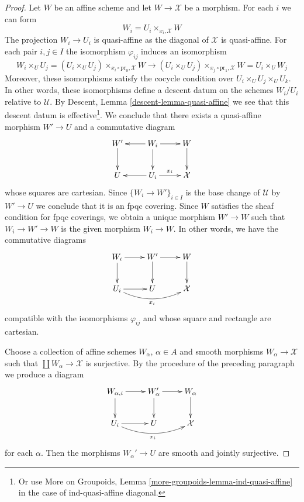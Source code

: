 \documentclass{stacks-project}
\theoremstyle{plain}
\theoremstyle{definition}
\theoremstyle{remark}
\numberwithin{equation}{subsection}
\begin{document}
\begin{proof}
\medskip\noindent
Let $W$ be an affine scheme and let $W \to \mathcal{X}$
be a morphism. For each $i$ we can form
$$
W_i = U_i \times_{x_i, \mathcal{X}} W
$$
The projection $W_i \to U_i$ is quasi-affine as the
diagonal of $\mathcal{X}$ is quasi-affine. For each pair
$i, j \in I$ the isomorphism $\varphi_{ij}$ induces
an isomorphism
$$
W_i \times_U U_j =
(U_i \times_U U_j) \times_{x_i \circ \text{pr}_0, \mathcal{X}} W
\to
(U_i \times_U U_j) \times_{x_j \circ \text{pr}_1, \mathcal{X}} W =
U_i \times_U W_j
$$
Moreover, these isomorphisms satisfy the cocycle condition over
$U_i \times_U U_j \times_U U_k$. In other words, these isomorphisms
define a descent datum on the schemes $W_i/U_i$ relative to $\mathcal{U}$.
By Descent, Lemma \ref{descent-lemma-quasi-affine}
we see that this descent datum is effective\footnote{Or use
More on Groupoids, Lemma \ref{more-groupoids-lemma-ind-quasi-affine}
in the case of ind-quasi-affine diagonal.}.
We conclude that there exists a quasi-affine morphism
$W' \to U$ and a commutative diagram
$$
\xymatrix{
W' \ar[d] &
W_i \ar[l] \ar[d] \ar[r] &
W \ar[d] \\
U &
U_i \ar[l] \ar[r]^{x_i} &
\mathcal{X}
}
$$
whose squares are cartesian. Since $\{W_i \to W'\}_{i \in I}$
is the base change of $\mathcal{U}$ by $W' \to U$ we conclude
that it is an fpqc covering. Since $W$ satisfies the sheaf
condition for fpqc coverings, we obtain a unique morphism
$W' \to W$ such that $W_i \to W' \to W$ is the given morphism
$W_i \to W$. In other words, we have the commutative diagrams
$$
\xymatrix{
W_i \ar[d] \ar[r] &
W' \ar[d] \ar[r] &
W \ar[d] \\
U_i \ar[r] \ar@/_1pc/[rr]_{x_i} &
U &
\mathcal{X}
}
$$
compatible with the isomorphisms $\varphi_{ij}$ and whose
square and rectangle are cartesian.

\medskip\noindent
Choose a collection of affine schemes $W_\alpha$, $\alpha \in A$
and smooth morphisms $W_\alpha \to \mathcal{X}$ such that
$\coprod W_\alpha \to \mathcal{X}$ is surjective.
By the procedure of the preceding paragraph we produce
a diagram
$$
\xymatrix{
W_{\alpha, i} \ar[d] \ar[r] &
W_\alpha' \ar[d] \ar[r] &
W_\alpha \ar[d] \\
U_i \ar[r] \ar@/_1pc/[rr]_{x_i} &
U &
\mathcal{X}
}
$$
for each $\alpha$. Then the morphisms $W_\alpha' \to U$ are
smooth and jointly surjective.


\end{proof}
\end{document}
